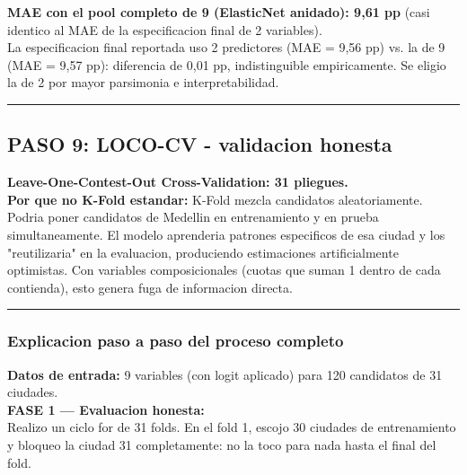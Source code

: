 \documentclass[11pt,a4paper]{article}
\begin{document}
{\textbf{MAE con el pool completo de 9 (ElasticNet anidado): 9,61 pp} (casi identico al MAE de la especificacion final de 2 variables).\\[2pt]

La especificacion final reportada uso 2 predictores (MAE = 9,56 pp) vs. la de 9 (MAE = 9,57 pp): diferencia de 0,01 pp, indistinguible empiricamente. Se eligio la de 2 por mayor parsimonia e interpretabilidad.\\[2pt]

\vspace{4pt}\noindent\rule{\linewidth}{0.4pt}\vspace{4pt}

\subsection{PASO 9: LOCO-CV - validacion honesta}

\textbf{Leave-One-Contest-Out Cross-Validation: 31 pliegues.}\\[2pt]

\textbf{Por que no K-Fold estandar:} K-Fold mezcla candidatos aleatoriamente. Podria poner candidatos de Medellin en entrenamiento y en prueba simultaneamente. El modelo aprenderia patrones especificos de esa ciudad y los "reutilizaria" en la evaluacion, produciendo estimaciones artificialmente optimistas. Con variables composicionales (cuotas que suman 1 dentro de cada contienda), esto genera fuga de informacion directa.\\[2pt]

\vspace{4pt}\noindent\rule{\linewidth}{0.4pt}\vspace{4pt}

\subsubsection{Explicacion paso a paso del proceso completo}

\textbf{Datos de entrada:} 9 variables (con logit aplicado) para 120 candidatos de 31 ciudades.\\[2pt]

\textbf{FASE 1 — Evaluacion honesta:}\\[2pt]

Realizo un ciclo for de 31 folds. En el fold 1, escojo 30 ciudades de entrenamiento y bloqueo la ciudad 31 completamente: no la toco para nada hasta el final del fold.\\[2pt]

}
\end{document}
